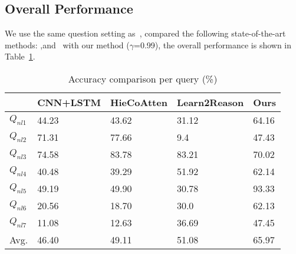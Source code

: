 \subsection{Overall Performance}
\label{sec-overall-performance}
We use the same question setting as~\cite{peixi2019}, compared the following state-of-the-art methods: \cite{VQA},and~\cite{hu2017learning} with our method ($\gamma$=0.99), the overall performance is shown in Table~\ref{table:stateofart}. 

\begin{table}[h]
\begin{small}
\begin{tabular}{|l|l|l|l|l|}
\hline
          & CNN+LSTM & HieCoAtten & Learn2Reason & Ours  \\ \hline
$Q_{nl1}$ & 44.23    & 43.62         & 31.12        & 64.16 \\ \hline
$Q_{nl2}$ & 71.31    & 77.66         & 9.4          & 47.43 \\ \hline
$Q_{nl3}$ & 74.58    & 83.78         & 83.21        & 70.02 \\ \hline
$Q_{nl4}$ & 40.48    & 39.29         & 51.92        & 62.14 \\ \hline
$Q_{nl5}$ & 49.19    & 49.90         & 30.78        & 93.33 \\ \hline
$Q_{nl6}$ & 20.56    & 18.70         & 30.0         & 62.13 \\ \hline
$Q_{nl7}$ & 11.08    & 12.63         & 36.69        & 47.45 \\ \hline
Avg.       & 46.40    & 49.11         & 51.08        & 65.97 \\ \hline
\end{tabular}
\caption{Accuracy comparison per query (\%)}
\label{table:stateofart}
\end{small}
\end{table}

